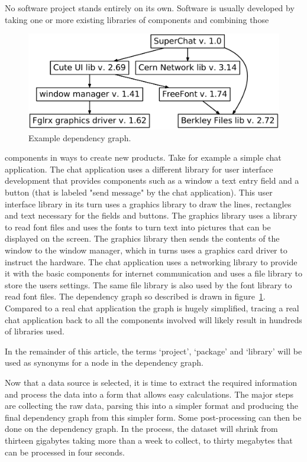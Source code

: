 \documentclass[smallextended,final]{svjour3}
\begin{document}
No software project stands entirely on its own. Software is usually developed by taking one or more existing libraries of components and combining those \begin{figure}
\small\centering
\includegraphics[width=\linewidth]{depgraph.pdf}
\caption{Example dependency graph.}\label{fig:depgraph-chat}
\vspace{-1em}
\end{figure}
components in ways to create new products. Take for example a simple chat application. The chat application uses a different library for user interface development that provides components such as a window a text entry field and a button (that is labeled "send message" by the chat application). This user interface library in its turn uses a graphics library to draw the lines, rectangles and text necessary for the fields and buttons. The graphics library uses a library to read font files and uses the fonts to turn text into pictures that can be displayed on the screen. The graphics library then sends the contents of the window to the window manager, which in turns uses a graphics card driver to instruct the hardware. The chat application uses a networking library to provide it with the basic components for internet communication and uses a file library to store the users settings. The same file library is also used by the font library to read font files. The dependency graph so described is drawn in figure~\ref{fig:depgraph-chat}. Compared to a real chat application the graph is hugely simplified, tracing a real chat application back to all the components involved will likely result in hundreds of libraries used.


In the remainder of this article, the terms `project', `package' and `library' will be used as synonyms for a node in the dependency graph.

Now that a data source is selected, it is time to extract the required information and process the data into a form that allows easy calculations. The major steps are collecting the raw data, parsing this into a simpler format and producing the final dependency graph from this simpler form. Some post-processing can then be done on the dependency graph. In the process, the dataset will shrink from thirteen gigabytes taking more than a week to collect, to thirty megabytes that can be processed in four seconds.
\end{document}
